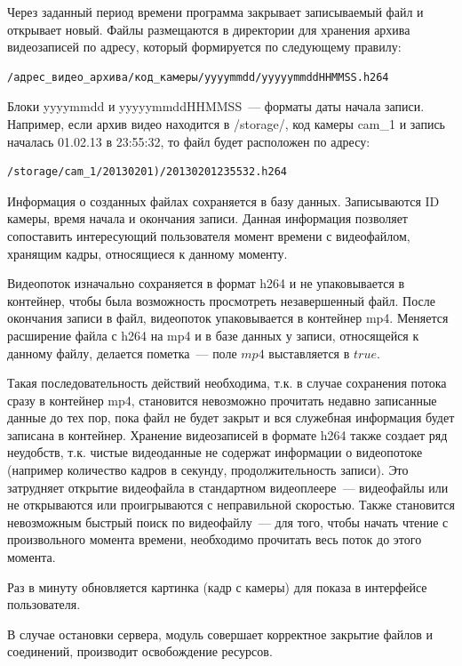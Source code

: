 Через заданный период времени программа закрывает записываемый файл и открывает новый.
Файлы размещаются в директории для хранения архива видеозаписей по адресу,
который формируется по следующему правилу:

\begin{verbatim}
/адрес_видео_архива/код_камеры/yyyymmdd/yyyyymmddHHMMSS.h264
\end{verbatim}

Блоки yyyymmdd и yyyyymmddHHMMSS~--- форматы даты начала записи.
Например, если архив видео находится в /storage/, код камеры cam\_1 и запись началась
01.02.13 в 23:55:32, то файл будет расположен по адресу:

\begin{verbatim}
/storage/cam_1/20130201)/20130201235532.h264
\end{verbatim}

Информация о созданных файлах сохраняется в базу данных.
Записываются ID камеры, время начала и окончания записи.
Данная информация позволяет сопоставить интересующий пользователя момент времени
с видеофайлом, хранящим кадры, относящиеся к данному моменту.

Видеопоток изначально сохраняется в формат h264 и не упаковывается в контейнер, чтобы была
возможность просмотреть незавершенный файл. После окончания записи в файл, видеопоток
упаковывается в контейнер mp4. Меняется расширение файла с h264 на mp4 и в базе данных
у записи, относящейся к данному файлу, делается пометка~--- поле $mp4$ выставляется
в $true$.

Такая последовательность действий необходима, т.к. в случае сохранения потока сразу в
контейнер mp4, становится невозможно прочитать недавно записанные данные до тех пор,
пока файл не будет закрыт и вся служебная информация будет записана в контейнер.
Хранение видеозаписей в формате h264 также создает ряд неудобств, т.к. чистые видеоданные не
содержат информации о видеопотоке (например количество кадров в секунду,
продолжительность записи). Это затрудняет открытие видеофайла в стандартном видеоплеере~---
видеофайлы или не открываются или проигрываются с неправильной скоростью.
Также становится невозможным быстрый поиск по видеофайлу~--- для того, чтобы начать чтение
с произвольного момента времени, необходимо прочитать весь поток до этого момента.

Раз в минуту обновляется картинка (кадр с камеры) для показа в интерфейсе пользователя.

В случае остановки сервера, модуль совершает корректное закрытие файлов и соединений,
производит освобождение ресурсов.

